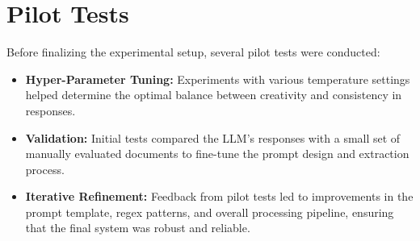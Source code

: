 \documentclass[../main.tex]{subfiles}
\begin{document}
\section{Pilot Tests}
Before finalizing the experimental setup, several pilot tests were conducted:

\begin{itemize}
    \item \textbf{Hyper-Parameter Tuning:}
 Experiments with various temperature settings helped determine the optimal balance between creativity and consistency in responses.
    \item \textbf{Validation:}
 Initial tests compared the LLM’s responses with a small set of manually evaluated documents to fine-tune the prompt design and extraction process.
    \item \textbf{Iterative Refinement:}
 Feedback from pilot tests led to improvements in the prompt template, regex patterns, and overall processing pipeline, ensuring that the final system was robust and reliable.
\end{itemize}


\ifSubfilesClassLoaded{
    
    
}{}
\end{document}

